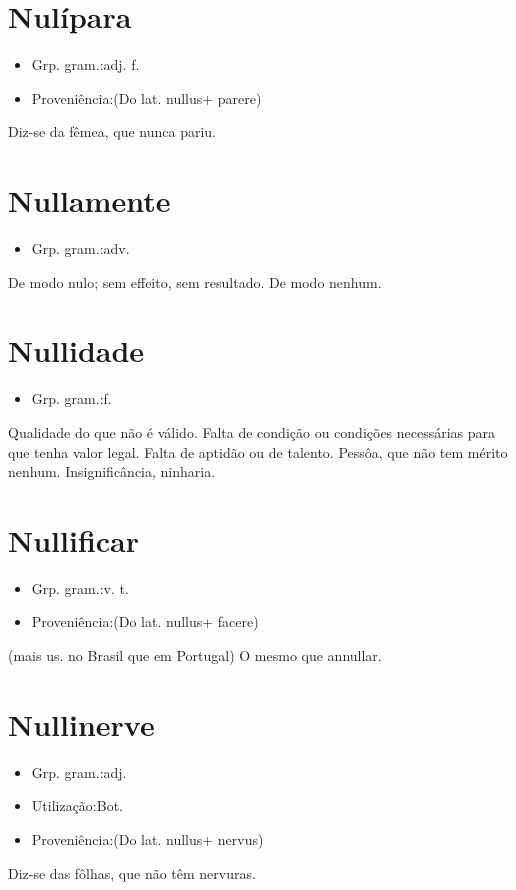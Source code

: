 \section{Nulípara}
\begin{itemize}
\item {Grp. gram.:adj. f.}
\end{itemize}
\begin{itemize}
\item {Proveniência:(Do lat. \textunderscore nullus\textunderscore  + \textunderscore parere\textunderscore )}
\end{itemize}
Diz-se da fêmea, que nunca pariu.
\section{Nullamente}
\begin{itemize}
\item {Grp. gram.:adv.}
\end{itemize}
De modo nulo; sem effeito, sem resultado.
De modo nenhum.
\section{Nullidade}
\begin{itemize}
\item {Grp. gram.:f.}
\end{itemize}
Qualidade do que não é válido.
Falta de condição ou condições necessárias para que tenha valor legal.
Falta de aptidão ou de talento.
Pessôa, que não tem mérito nenhum.
Insignificância, ninharia.
\section{Nullificar}
\begin{itemize}
\item {Grp. gram.:v. t.}
\end{itemize}
\begin{itemize}
\item {Proveniência:(Do lat. \textunderscore nullus\textunderscore  + \textunderscore facere\textunderscore )}
\end{itemize}
(mais us. no Brasil que em Portugal)
O mesmo que \textunderscore annullar\textunderscore .
\section{Nullinerve}
\begin{itemize}
\item {Grp. gram.:adj.}
\end{itemize}
\begin{itemize}
\item {Utilização:Bot.}
\end{itemize}
\begin{itemize}
\item {Proveniência:(Do lat. \textunderscore nullus\textunderscore  + \textunderscore nervus\textunderscore )}
\end{itemize}
Diz-se das fôlhas, que não têm nervuras.
